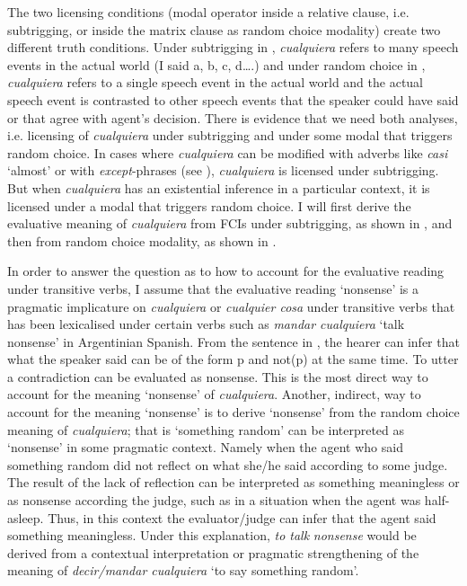 The two licensing conditions (modal operator inside a relative clause, i.e. subtrigging, or inside the matrix clause as random choice modality) create two different truth conditions. Under subtrigging in , \textit{cualquiera} refers to many speech events in the actual world (I said a, b, c, d….) and under random choice in , \textit{cualquiera} refers to a single speech event in the actual world and the actual speech event is contrasted to other speech events that the speaker could have said or that agree with agent’s decision. There is evidence that we need both analyses, i.e. licensing of \textit{cualquiera} under subtrigging and under some modal that triggers random choice. In cases where \textit{cualquiera} can be modified with adverbs like \textit{casi} ‘almost’ or with \textit{except}{}-phrases (see ), \textit{cualquiera} is licensed under subtrigging. But when \textit{cualquiera} has an existential inference in a particular context, it is licensed under a modal that triggers random choice. I will first derive the evaluative meaning of \textit{cualquiera} from FCIs under subtrigging, as shown in , and then from random choice modality, as shown in .

In order to answer the question as to how to account for the evaluative reading under transitive verbs, I assume that the evaluative reading ‘nonsense’ is a pragmatic implicature on \textit{cualquiera} or \textit{cualquier cosa} under transitive verbs that has been lexicalised under certain verbs such as \textit{mandar cualquiera} ‘talk nonsense’ in Argentinian Spanish. From the sentence in , the hearer can infer that what the speaker said can be of the form p and not(p) at the same time. To utter a contradiction can be evaluated as nonsense. This is the most direct way to account for the meaning ‘nonsense’ of \textit{cualquiera}. Another, indirect, way to account for the meaning ‘nonsense’ is to derive ‘nonsense’ from the random choice meaning of \textit{cualquiera}; that is ‘something random’ can be interpreted as ‘nonsense’ in some pragmatic context. Namely when the agent who said something random did not reflect on what she/he said according to some judge. The result of the lack of reflection can be interpreted as something meaningless or as nonsense according the judge, such as in a situation when the agent was half-asleep. Thus, in this context the evaluator/judge can infer that the agent said something meaningless. Under this explanation, \textit{to talk} \textit{nonsense} would be derived from a contextual interpretation or pragmatic strengthening of the meaning of \textit{decir/mandar cualquiera} ‘to say something random’.

